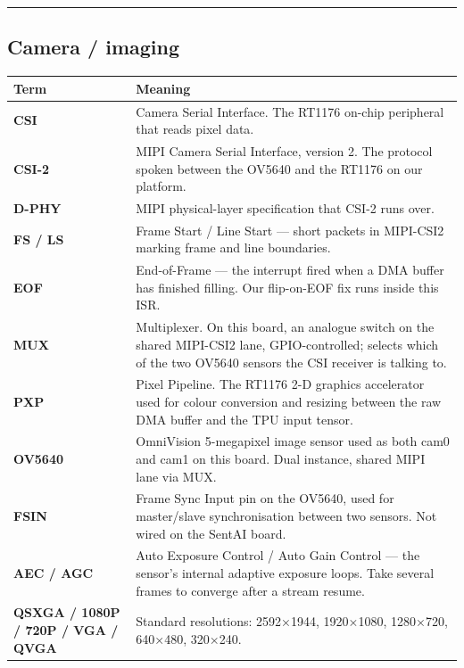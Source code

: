 \begin{center}\rule{0.5\linewidth}{0.5pt}\end{center}

\subsection{Camera / imaging}\label{camera-imaging}

{\def\LTcaptype{none} %
\begin{longtable}[]{@{}
  >{\raggedright\arraybackslash}p{}
  >{\raggedright\arraybackslash}p{}@{}}
\toprule\noalign{}
\begin{minipage}[b]{\linewidth}\raggedright
Term
\end{minipage} & \begin{minipage}[b]{\linewidth}\raggedright
Meaning
\end{minipage} \\
\midrule\noalign{}
\endhead
\bottomrule\noalign{}
\endlastfoot
\textbf{CSI} & Camera Serial Interface. The RT1176 on-chip peripheral
that reads pixel data. \\
\textbf{CSI-2} & MIPI Camera Serial Interface, version 2. The protocol
spoken between the OV5640 and the RT1176 on our platform. \\
\textbf{D-PHY} & MIPI physical-layer specification that CSI-2 runs
over. \\
\textbf{FS / LS} & Frame Start / Line Start --- short packets in
MIPI-CSI2 marking frame and line boundaries. \\
\textbf{EOF} & End-of-Frame --- the interrupt fired when a DMA buffer
has finished filling. Our flip-on-EOF fix runs inside this ISR. \\
\textbf{MUX} & Multiplexer. On this board, an analogue switch on the
shared MIPI-CSI2 lane, GPIO-controlled; selects which of the two OV5640
sensors the CSI receiver is talking to. \\
\textbf{PXP} & Pixel Pipeline. The RT1176 2-D graphics accelerator used
for colour conversion and resizing between the raw DMA buffer and the
TPU input tensor. \\
\textbf{OV5640} & OmniVision 5-megapixel image sensor used as both cam0
and cam1 on this board. Dual instance, shared MIPI lane via MUX. \\
\textbf{FSIN} & Frame Sync Input pin on the OV5640, used for
master/slave synchronisation between two sensors. Not wired on the
SentAI board. \\
\textbf{AEC / AGC} & Auto Exposure Control / Auto Gain Control --- the
sensor's internal adaptive exposure loops. Take several frames to
converge after a stream resume. \\
\textbf{QSXGA / 1080P / 720P / VGA / QVGA} & Standard resolutions:
2592×1944, 1920×1080, 1280×720, 640×480, 320×240. \\
\end{longtable}
}

